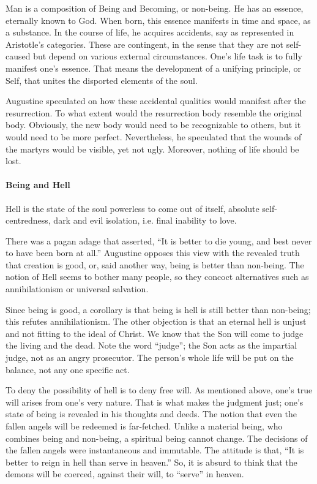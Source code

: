 Man is a composition of Being and Becoming, or non-being. He has an essence, eternally known to God. When born, this essence manifests in time and space, as a substance. In the course of life, he acquires accidents, say as represented in Aristotle's categories. These are contingent, in the sense that they are not self-caused but depend on various external circumstances. One's life task is to fully manifest one's essence. That means the development of a unifying principle, or Self, that unites the disported elements of the soul.

Augustine speculated on how these accidental qualities would manifest after the resurrection. To what extent would the resurrection body resemble the original body. Obviously, the new body would need to be recognizable to others, but it would need to be more perfect. Nevertheless, he speculated that the wounds of the martyrs would be visible, yet not ugly. Moreover, nothing of life should be lost.

\paragraph{Being and Hell}


\begin{quotex}
Hell is the state of the soul powerless to come out of itself, absolute self-centredness, dark and evil isolation, i.e. final inability to love.
\end{quotex}


There was a pagan adage that asserted, ``It is better to die young, and best never to have been born at all.'' Augustine opposes this view with the revealed truth that creation is good, or, said another way, being is better than non-being. The notion of Hell seems to bother many people, so they concoct alternatives such as annihilationism or universal salvation.

Since being is good, a corollary is that being is hell is still better than non-being; this refutes annihilationism. The other objection is that an eternal hell is unjust and not fitting to the ideal of Christ. We know that the Son will come to judge the living and the dead. Note the word ``judge''; the Son acts as the impartial judge, not as an angry prosecutor. The person's whole life will be put on the balance, not any one specific act.

To deny the possibility of hell is to deny free will. As mentioned above, one's true will arises from one's very nature. That is what makes the judgment just; one's state of being is revealed in his thoughts and deeds. The notion that even the fallen angels will be redeemed is far-fetched. Unlike a material being, who combines being and non-being, a spiritual being cannot change. The decisions of the fallen angels were instantaneous and immutable. The attitude is that, ``It is better to reign in hell than serve in heaven.'' So, it is absurd to think that the demons will be coerced, against their will, to ``serve'' in heaven.

